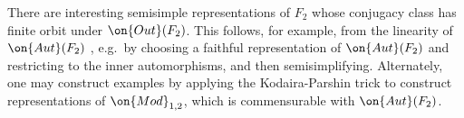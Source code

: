\begin{remark}
There are interesting semisimple representations of $F_2$ whose conjugacy class
has finite orbit under $\on{Out}(F_2)$. This follows, for example, from the linearity of $\on{Aut}(F_2)$ \cite{krammer2000braid}, e.g.~by choosing a faithful representation of $\on{Aut}(F_2)$ and restricting to the inner automorphisms, and then semisimplifying. Alternately, one may construct examples by applying the Kodaira-Parshin trick to construct representations of $\on{Mod}_{1,2}$, which is commensurable with $\on{Aut}(F_2)$.
\end{remark}

